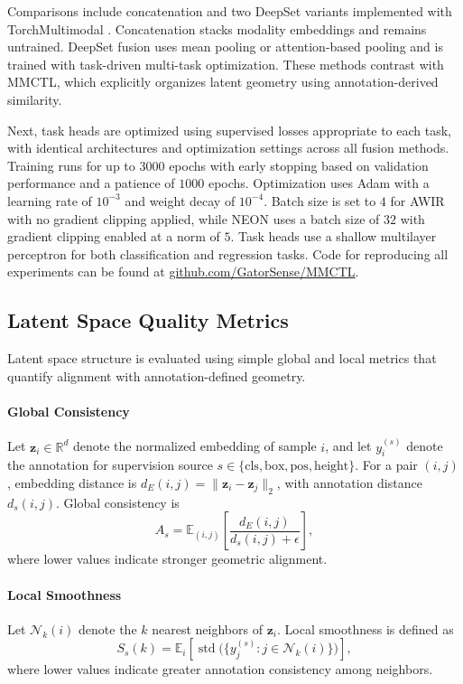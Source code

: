 \documentclass[lettersize,journal]{IEEEtran}
\begin{document}
Comparisons include concatenation and two DeepSet variants implemented with TorchMultimodal \cite{Facebookresearch}. Concatenation stacks modality embeddings and remains untrained. DeepSet fusion uses mean pooling \cite{reiter2020deep} or attention-based pooling and is trained with task-driven multi-task optimization. These methods contrast with MMCTL, which explicitly organizes latent geometry using annotation-derived similarity.

Next, task heads are optimized using supervised losses appropriate to each task, with identical architectures and optimization settings across all fusion methods. Training runs for up to $3000$ epochs with early stopping based on validation performance and a patience of $1000$ epochs. Optimization uses Adam with a learning rate of $10^{-3}$ and weight decay of $10^{-4}$. Batch size is set to $4$ for AWIR with no gradient clipping applied, while NEON uses a batch size of $32$ with gradient clipping enabled at a norm of $5$. Task heads use a shallow multilayer perceptron for both classification and regression tasks. Code for reproducing all experiments can be found at
\href{https://github.com/GatorSense/MMCTL}{github.com/GatorSense/MMCTL}.


\subsection{Latent Space Quality Metrics}
\label{sec:latent_space_quality_metrics}
Latent space structure is evaluated using simple global and local metrics that quantify alignment with annotation-defined geometry.

\paragraph{Global Consistency}
Let $\mathbf{z}_i \in \mathbb{R}^{d}$ denote the normalized embedding of sample $i$, and let $y_i^{(s)}$ denote the annotation for supervision source $s \in \{\mathrm{cls}, \mathrm{box}, \mathrm{pos}, \mathrm{height}\}$. For a pair $(i,j)$, embedding distance is $d_E(i,j) = \lVert \mathbf{z}_i - \mathbf{z}_j \rVert_2$, with annotation distance $d_s(i,j)$. Global consistency is
\begin{equation}
A_s
=
\mathbb{E}_{(i,j)}
\left[
\frac{d_E(i,j)}{d_s(i,j) + \epsilon}
\right],
\end{equation}
where lower values indicate stronger geometric alignment.

\paragraph{Local Smoothness}
Let $\mathcal{N}_k(i)$ denote the $k$ nearest neighbors of $\mathbf{z}_i$. Local smoothness is defined as
\begin{equation}
S_s(k)
=
\mathbb{E}_{i}
\left[
\operatorname{std}
\big(
\{ y_j^{(s)} : j \in \mathcal{N}_k(i) \}
\big)
\right],
\end{equation}
where lower values indicate greater annotation consistency among neighbors.
\end{document}
